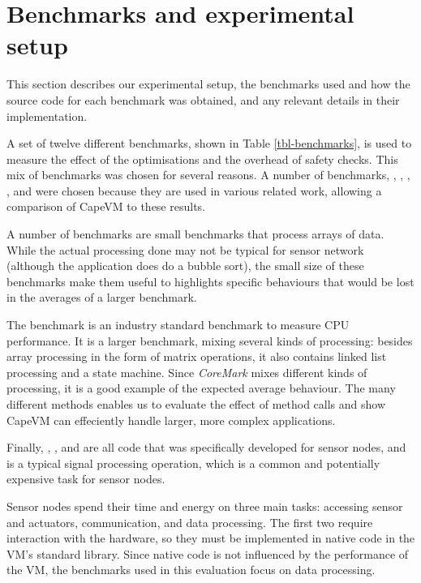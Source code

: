 
\section{Benchmarks and experimental setup}
\label{sec-evaluation-benchmarks}

This section describes our experimental setup, the benchmarks used and how the source code for each benchmark was obtained, and any relevant details in their implementation.

A set of twelve different benchmarks, shown in Table \ref{tbl-benchmarks}, is used to measure the effect of the optimisations and the overhead of safety checks. This mix of benchmarks was chosen for several reasons. A number of benchmarks, , , , , and  were chosen because they are used in various related work, allowing a comparison of CapeVM to these results.

A number of benchmarks are small benchmarks that process arrays of data. While the actual processing done may not be typical for sensor network (although the  application does do a bubble sort), the small size of these benchmarks make them useful to highlights specific behaviours that would be lost in the averages of a larger benchmark.

The  benchmark is an industry standard benchmark to measure CPU performance. It is a larger benchmark, mixing several kinds of processing: besides array processing in the form of matrix operations, it also contains linked list processing and a state machine. Since \emph{CoreMark} mixes different kinds of processing, it is a good example of the expected average behaviour. The many different methods enables us to evaluate the effect of method calls and show CapeVM can effeciently handle larger, more complex applications.

Finally, , ,  and  are all code that was specifically developed for sensor nodes, and  is a typical signal processing operation, which is a common and potentially expensive task for sensor nodes.

Sensor nodes spend their time and energy on three main tasks: accessing sensor and actuators, communication, and data processing. The first two require interaction with the hardware, so they must be implemented in native code in the VM's standard library. Since native code is not influenced by the performance of the VM, the benchmarks used in this evaluation focus on data processing.

